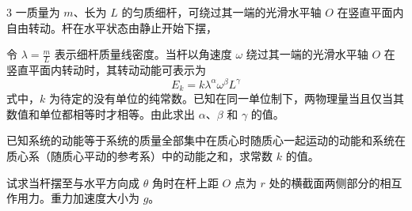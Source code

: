 \begin{problem}[第30届全国中学生物理竞赛复赛][匀质细杆转动]{3}
一质量为 $m$、长为 $L$ 的匀质细杆，可绕过其一端的光滑水平轴 $O$ 在竖直平面内自由转动。杆在水平状态由静止开始下摆，
\begin{subproblem}
令 $\lambda = \frac{m}{L}$ 表示细杆质量线密度。当杆以角速度 $\omega$ 绕过其一端的光滑水平轴 $O$ 在竖直平面内转动时，其转动动能可表示为
\begin{equation*}
E_{k} = k \lambda^{\alpha} \omega^{\beta} L^{\gamma}
\end{equation*}
式中，$k$ 为待定的没有单位的纯常数。已知在同一单位制下，两物理量当且仅当其数值和单位都相等时才相等。由此求出 $\alpha$、$\beta$ 和 $\gamma$ 的值。
\end{subproblem}
\begin{subproblem}
已知系统的动能等于系统的质量全部集中在质心时随质心一起运动的动能和系统在质心系（随质心平动的参考系）中的动能之和，求常数 $k$ 的值。
\end{subproblem}
\begin{subproblem}
试求当杆摆至与水平方向成 $\theta$ 角时在杆上距 $O$ 点为 $r$ 处的横截面两侧部分的相互作用力。重力加速度大小为 $g$。
\end{subproblem}
\end{problem}
